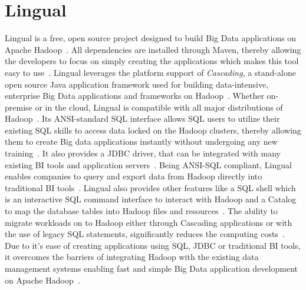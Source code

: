 \section{Lingual}

Lingual is a free, open source project designed to build Big Data applications
on Apache Hadoop~\cite{hid-sp18-516-www-drivenio-lingual}. All dependencies are
installed through Maven, thereby allowing the developers to focus on simply
creating the applications which makes this tool easy to
use~\cite{hid-sp18-516-www-cascading}. Lingual leverages the platform support of
\textit{Cascading}, a stand-alone open source Java application
framework used for building data-intensive, enterprise Big Data applications and
frameworks on Hadoop~\cite{hid-sp18-516-www-drivenio-lingual}. Whether
on-premise or in the cloud, Lingual is compatible with all major distributions
of Hadoop~\cite{hid-sp18-516-www-drivenio-lingual}. Its ANSI-standard
SQL interface allows SQL users to utilize their existing SQL
skills to access data locked on the Hadoop clusters, thereby
allowing them to create Big data applications instantly without undergoing any
new training~\cite{hid-sp18-516-www-drivenio-lingual}. It also provides a JDBC
driver, that can be integrated with many existing BI tools and application
servers~\cite{hid-sp18-516-www-cascading}. Being ANSI-SQL compliant, Lingual
enables companies to query and export data from Hadoop directly into traditional
BI tools~\cite{hid-sp18-516-www-cascading}. Lingual also provides other features
like a SQL shell which is an interactive SQL command interface to interact with
Hadoop and a Catalog to map the database tables into Hadoop files and
resources~\cite{hid-sp18-516-www-cascading}. The ability to migrate workloads on
to Hadoop either through Cascading applications or with the use of legacy SQL
statements, significantly reduces the computing
costs~\cite{hid-sp18-516-www-cascading}. Due to it's ease of creating
applications using SQL, JDBC or traditional BI tools, it overcomes the barriers
of integrating Hadoop with the existing data management systems enabling fast
and simple Big Data application development on Apache
Hadoop~\cite{hid-sp18-516-www-drivenio-lingual}.
